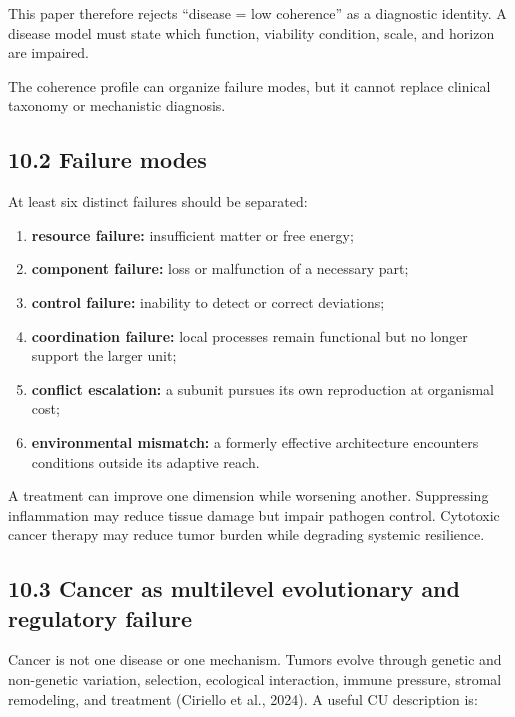 \documentclass[
  11pt,
]{article}
\providecommand{\tightlist}{%
  \setlength{\itemsep}{0pt}\setlength{\parskip}{0pt}}
\begin{document}
This paper therefore rejects ``disease = low coherence'' as a diagnostic
identity. A disease model must state which function, viability
condition, scale, and horizon are impaired.

The coherence profile can organize failure modes, but it cannot replace
clinical taxonomy or mechanistic diagnosis.

\subsection{10.2 Failure modes}\label{failure-modes}

At least six distinct failures should be separated:

\begin{enumerate}
\def\labelenumi{\arabic{enumi}.}
\tightlist
\item
  \textbf{resource failure:} insufficient matter or free energy;
\item
  \textbf{component failure:} loss or malfunction of a necessary part;
\item
  \textbf{control failure:} inability to detect or correct deviations;
\item
  \textbf{coordination failure:} local processes remain functional but
  no longer support the larger unit;
\item
  \textbf{conflict escalation:} a subunit pursues its own reproduction
  at organismal cost;
\item
  \textbf{environmental mismatch:} a formerly effective architecture
  encounters conditions outside its adaptive reach.
\end{enumerate}

A treatment can improve one dimension while worsening another.
Suppressing inflammation may reduce tissue damage but impair pathogen
control. Cytotoxic cancer therapy may reduce tumor burden while
degrading systemic resilience.

\subsection{10.3 Cancer as multilevel evolutionary and regulatory
failure}\label{cancer-as-multilevel-evolutionary-and-regulatory-failure}

Cancer is not one disease or one mechanism. Tumors evolve through
genetic and non-genetic variation, selection, ecological interaction,
immune pressure, stromal remodeling, and treatment (Ciriello et al.,
2024). A useful CU description is:
\end{document}
